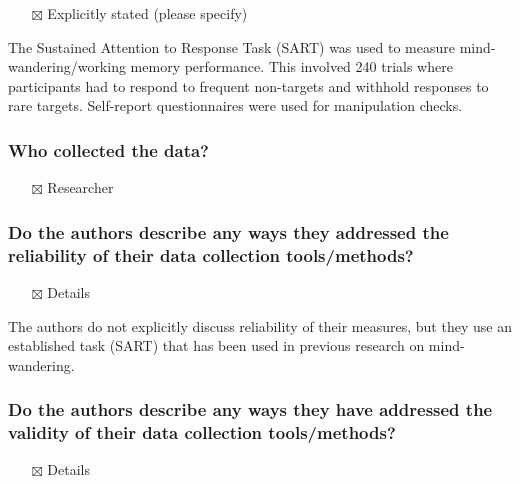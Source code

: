 \documentclass[
  doc, a4paper]{apa7}
\providecommand{\tightlist}{%
  \setlength{\itemsep}{0pt}\setlength{\parskip}{0pt}}
\begin{document}
\begin{itemize}
\tightlist
\item[$\boxtimes$]
  Explicitly stated (please specify)
\end{itemize}

The Sustained Attention to Response Task (SART) was used to measure mind-wandering/working memory performance. This involved 240 trials where participants had to respond to frequent non-targets and withhold responses to rare targets. Self-report questionnaires were used for manipulation checks.

\subsubsection{Who collected the data?}\label{who-collected-the-data}

\begin{itemize}
\tightlist
\item[$\boxtimes$]
  Researcher
\end{itemize}

\subsubsection{Do the authors describe any ways they addressed the reliability of their data collection tools/methods?}\label{do-the-authors-describe-any-ways-they-addressed-the-reliability-of-their-data-collection-toolsmethods}

\begin{itemize}
\tightlist
\item[$\boxtimes$]
  Details
\end{itemize}

The authors do not explicitly discuss reliability of their measures, but they use an established task (SART) that has been used in previous research on mind-wandering.

\subsubsection{Do the authors describe any ways they have addressed the validity of their data collection tools/methods?}\label{do-the-authors-describe-any-ways-they-have-addressed-the-validity-of-their-data-collection-toolsmethods}

\begin{itemize}
\tightlist
\item[$\boxtimes$]
  Details
\end{itemize}
\end{document}
